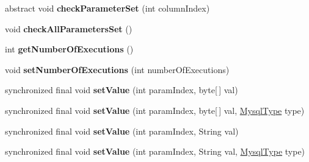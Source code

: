 \begin{DoxyCompactItemize}
\mbox{\label{classcom_1_1mysql_1_1cj_1_1_abstract_query_bindings_a0df45abda5a160a740ff9206f3f05f7a}} 
abstract void {\bfseries check\+Parameter\+Set} (int column\+Index)
\item 
\mbox{\label{classcom_1_1mysql_1_1cj_1_1_abstract_query_bindings_a7e9658d2e8bcf61a2e0a7b020d31e2ee}} 
void {\bfseries check\+All\+Parameters\+Set} ()
\item 
\mbox{\label{classcom_1_1mysql_1_1cj_1_1_abstract_query_bindings_afd9bf3e5bb4ecf783818274f798be6e8}} 
int {\bfseries get\+Number\+Of\+Executions} ()
\item 
\mbox{\label{classcom_1_1mysql_1_1cj_1_1_abstract_query_bindings_a2f4900412aa5d9ea460e8d246d45a85a}} 
void {\bfseries set\+Number\+Of\+Executions} (int number\+Of\+Executions)
\item 
\mbox{\label{classcom_1_1mysql_1_1cj_1_1_abstract_query_bindings_a2baacdf89019d5ad8cadbbec82603991}} 
synchronized final void {\bfseries set\+Value} (int param\+Index, byte\mbox{[}$\,$\mbox{]} val)
\item 
\mbox{\label{classcom_1_1mysql_1_1cj_1_1_abstract_query_bindings_a7d6e6794a12d22bc55d8c5bd33640e3c}} 
synchronized final void {\bfseries set\+Value} (int param\+Index, byte\mbox{[}$\,$\mbox{]} val, \mbox{\hyperlink{enumcom_1_1mysql_1_1cj_1_1_mysql_type}{Mysql\+Type}} type)
\item 
\mbox{\label{classcom_1_1mysql_1_1cj_1_1_abstract_query_bindings_a43058029a8ced3bde792ae2c9c107fff}} 
synchronized final void {\bfseries set\+Value} (int param\+Index, String val)
\item 
\mbox{\label{classcom_1_1mysql_1_1cj_1_1_abstract_query_bindings_a2c33843c7f8093c1a56583fa57510456}} 
synchronized final void {\bfseries set\+Value} (int param\+Index, String val, \mbox{\hyperlink{enumcom_1_1mysql_1_1cj_1_1_mysql_type}{Mysql\+Type}} type)

\end{DoxyCompactItemize}
